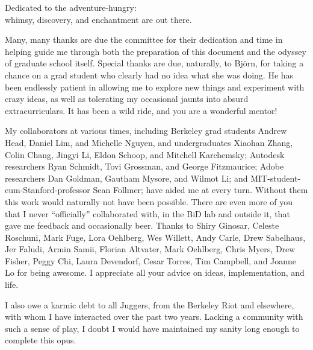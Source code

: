 \documentclass[oldfontcommands]{ucbthesis}
\begin{document}
\begin{frontmatter}

\begin{dedication}
\null\vfil
\begin{center}
Dedicated to the adventure-hungry:\\\vspace{12pt}
whimsy, discovery, and enchantment are out there.
\end{center}
\vfil\null
\end{dedication}

\tableofcontents
\clearpage
\listoffigures

\begin{acknowledgements}
Many, many thanks are due the committee for their dedication and time in helping guide me through both the preparation of this document and the odyssey of graduate school itself. Special thanks are due, naturally, to Bj\"orn, for taking a chance on a grad student who clearly had no idea what she was doing. He has been endlessly patient in allowing me to explore new things and experiment with crazy ideas, as well as tolerating my occasional jaunts into absurd extracurriculars. It has been a wild ride, and you are a wonderful mentor! 

My collaborators at various times, including Berkeley grad students Andrew Head, Daniel Lim, and Michelle Nguyen, and undergraduates Xiaohan Zhang, Colin Chang, Jingyi Li, Eldon Schoop, and Mitchell Karchemsky; Autodesk researchers Ryan Schmidt, Tovi Grossman, and George Fitzmaurice; Adobe researchers Dan Goldman, Gautham Mysore, and Wilmot Li; and MIT-student-cum-Stanford-professor Sean Follmer; have aided me at every turn. Without them this work would naturally not have been possible. There are even more of you that I never ``officially'' collaborated with, in the BiD lab and outside it, that gave me feedback and occasionally beer. Thanks to Shiry Ginosar, Celeste Roschuni, Mark Fuge, Lora Oehlberg, Wes Willett, Andy Carle, Drew Sabelhaus, Jer Faludi, Armin Samii, Florian Altvater, Mark Oehlberg, Chris Myers, Drew Fisher, Peggy Chi, Laura Devendorf, Cesar Torres, Tim Campbell, and Joanne Lo for being awesome. I appreciate all your advice on ideas, implementation, and life.

I also owe a karmic debt to all Juggers, from the Berkeley Riot and elsewhere, with whom I have interacted over the past two years. Lacking a community with such a sense of play, I doubt I would have maintained my sanity long enough to complete this opus.


\end{acknowledgements}
\end{frontmatter}
\end{document}

